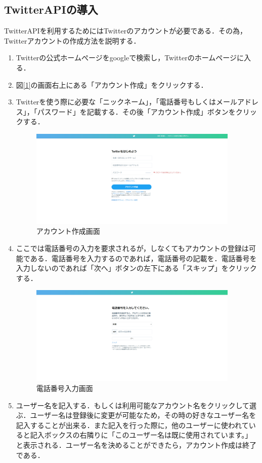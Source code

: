 \subsection{TwitterAPIの導入}
TwitterAPIを利用するためにはTwitterのアカウントが必要である．その為，Twitterアカウントの作成方法を説明する．
\begin{enumerate}
\item Twitterの公式ホームぺージをgoogleで検索し，Twitterのホームページに入る．
\item 図\ref{1}の画面右上にある「アカウント作成」をクリックする．
\item Twitterを使う際に必要な「ニックネーム」，「電話番号もしくはメールアドレス」，「パスワード」を記載する．その後「アカウント作成」ボタンをクリックする．
\begin{figure}[htb]
\centering
\includegraphics[width=10cm]{07.png}
\caption{アカウント作成画面}\label{7}
\end{figure}
\item ここでは電話番号の入力を要求されるが，しなくてもアカウントの登録は可能である．電話番号を入力するのであれば，電話番号の記載を．電話番号を入力しないのであれば「次へ」ボタンの左下にある「スキップ」をクリックする．
\begin{figure}[htb]
\centering
\includegraphics[width=10cm]{08.png}
\caption{電話番号入力画面}\label{8}
\end{figure}
\newpage
\item ユーザー名を記入する．もしくは利用可能なアカウント名をクリックして選ぶ．ユーザー名は登録後に変更が可能なため，その時の好きなユーザー名を記入することが出来る．また記入を行った際に，他のユーザーに使われていると記入ボックスの右隣りに「このユーザー名は既に使用されています。」と表示される．ユーザー名を決めることができたら，アカウント作成は終了である．

\end{enumerate}
